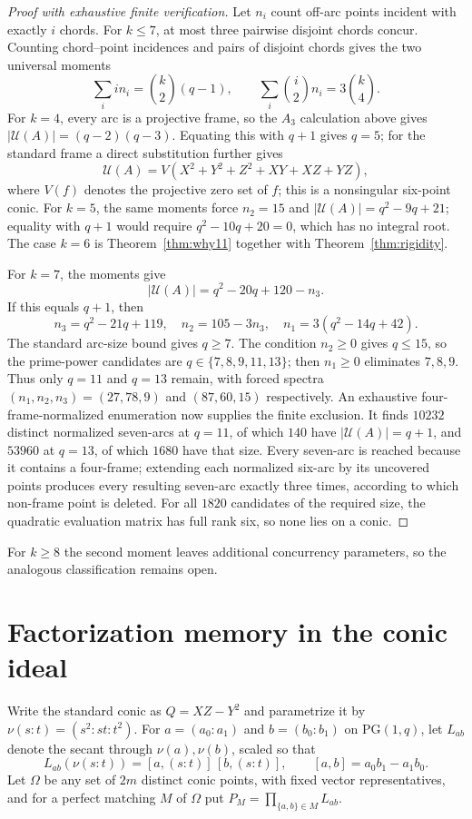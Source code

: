 \documentclass[11pt]{article}
\theoremstyle{definition}
\theoremstyle{remark}
\newcommand{\PG}{\mathrm{PG}}
\newcommand{\cU}{\mathcal{U}}
\begin{document}
\begin{proof}[Proof with exhaustive finite verification]
Let $n_i$ count off-arc points incident with exactly $i$ chords. For
$k\le7$, at most three pairwise disjoint chords concur. Counting
chord--point incidences and pairs of disjoint chords gives the two universal
moments
\[
 \sum_i i n_i=\binom{k}{2}(q-1),\qquad
 \sum_i\binom{i}{2}n_i=3\binom{k}{4}.
\]
For $k=4$, every arc is a projective frame, so the $A_3$ calculation above
gives $|\cU(A)|=(q-2)(q-3)$. Equating this with $q+1$ gives $q=5$; for the
standard frame a direct substitution further gives
\[
 \cU(A)=V(X^2+Y^2+Z^2+XY+XZ+YZ),
\]
where $V(f)$ denotes the projective zero set of $f$; this is a nonsingular
six-point conic. For $k=5$, the same moments force
$n_2=15$ and $|\cU(A)|=q^2-9q+21$; equality with $q+1$ would require
$q^2-10q+20=0$, which has no integral root. The case $k=6$ is
Theorem~\ref{thm:why11} together with Theorem~\ref{thm:rigidity}.

For $k=7$, the moments give
\[
 |\cU(A)|=q^2-20q+120-n_3.
\]
If this equals $q+1$, then
\[
 n_3=q^2-21q+119,\quad
 n_2=105-3n_3,\quad
 n_1=3(q^2-14q+42).
\]
The standard arc-size bound gives $q\ge7$.  The condition $n_2\ge0$ gives
$q\le15$, so the prime-power candidates are
$q\in\{7,8,9,11,13\}$; then $n_1\ge0$ eliminates $7,8,9$.
Thus only $q=11$ and $q=13$ remain, with forced spectra
$(n_1,n_2,n_3)=(27,78,9)$ and $(87,60,15)$ respectively. An exhaustive
four-frame-normalized enumeration now supplies the finite exclusion. It
finds $10232$ distinct normalized seven-arcs at $q=11$, of which $140$ have
$|\cU(A)|=q+1$, and $53960$ at $q=13$, of which $1680$ have that size.
Every seven-arc is reached because it contains a four-frame; extending each
normalized six-arc by its uncovered points produces every resulting
seven-arc exactly three times, according to which non-frame point is
deleted. For all $1820$ candidates of the required size, the quadratic
evaluation matrix has full rank six, so none lies on a conic.
\end{proof}

For $k\ge8$ the second moment leaves additional concurrency parameters, so
the analogous classification remains open.

\section{Factorization memory in the conic ideal}
\label{sec:factorization}

Write the standard conic as $Q=XZ-Y^2$ and parametrize it by
$\nu(s:t)=(s^2:st:t^2)$.  For $a=(a_0:a_1)$ and $b=(b_0:b_1)$ on
$\PG(1,q)$, let $L_{ab}$ denote the secant through $\nu(a),\nu(b)$, scaled
so that
\[
 L_{ab}(\nu(s:t))=[a,(s:t)]\,[b,(s:t)],
 \qquad
 [a,b]=a_0b_1-a_1b_0.
\]
Let $\Omega$ be any set of $2m$ distinct conic points, with fixed vector
representatives, and for a perfect matching $M$ of $\Omega$ put
$P_M=\prod_{\{a,b\}\in M}L_{ab}$.
\end{document}

